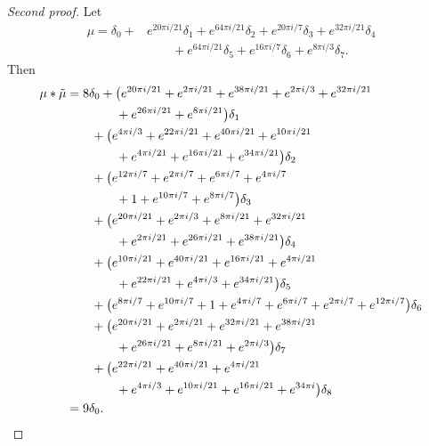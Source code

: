 \begin{proof}[Second proof] Let \begin{align*}\mu =
 \delta_{0}  + &  e^{ 20\pi i  / 21}\delta_{1}  +   e^{ 64\pi i  / 21}\delta_{2}  +   e^{ 20\pi i  / 7}\delta_{3}  +   e^{ 32\pi i  / 21}\delta_{4}  \\ &\qquad +   e^{ 64\pi i  / 21}\delta_{5}  +   e^{ 16\pi i  / 7}\delta_{6}  +   e^{ 8\pi i  / 3}\delta_{7}
.\end{align*}
  Then
\begin{align*} \mu * \tilde\mu&=   8\delta_{0}  +  \big( e^{ 20 \pi i / 21}+ e^{ 2 \pi i / 21}+ e^{ 38 \pi i / 21}+ e^{ 2 \pi i / 3}+ e^{ 32 \pi i / 21}
\\& \qquad \qquad+ e^{ 26 \pi i / 21}+ e^{ 8 \pi i / 21}\big)\delta_{1} 
\\& \qquad
 +  \big( e^{ 4 \pi i / 3}+ e^{ 22 \pi i / 21}+ e^{ 40 \pi i / 21}+ e^{ 10 \pi i / 21}
\\& \qquad \qquad+ e^{ 4 \pi i / 21}+ e^{ 16 \pi i / 21}+ e^{ 34 \pi i / 21}\big)\delta_{2} 
\\& \qquad
 +  \big( e^{ 12 \pi i / 7}+ e^{ 2 \pi i / 7}+ e^{ 6 \pi i / 7}+ e^{ 4 \pi i / 7}
\\& \qquad \qquad+ 1+ e^{ 10 \pi i / 7}+ e^{ 8 \pi i / 7}\big)\delta_{3} 
\\& \qquad
 +  \big( e^{ 20 \pi i / 21}+ e^{ 2 \pi i / 3}+ e^{ 8 \pi i / 21}+ e^{ 32 \pi i / 21}
\\& \qquad \qquad+ e^{ 2 \pi i / 21}+ e^{ 26 \pi i / 21}+ e^{ 38 \pi i / 21}\big)\delta_{4} 
\\& \qquad
 +  \big( e^{ 10 \pi i / 21}+ e^{ 40 \pi i / 21}+ e^{ 16 \pi i / 21}+ e^{ 4 \pi i / 21}
\\& \qquad \qquad+ e^{ 22 \pi i / 21}+ e^{ 4 \pi i / 3}+ e^{ 34 \pi i / 21}\big)\delta_{5} 
\\& \qquad
 +  \big( e^{ 8 \pi i / 7}+ e^{ 10 \pi i / 7}+ 1+ e^{ 4 \pi i / 7}+ e^{ 6 \pi i / 7}+ e^{ 2 \pi i / 7}+ e^{ 12 \pi i / 7}\big)\delta_{6} 
\\& \qquad
 +  \big( e^{ 20 \pi i / 21}+ e^{ 2 \pi i / 21}+ e^{ 32 \pi i / 21}+ e^{ 38 \pi i / 21}
\\& \qquad \qquad+ e^{ 26 \pi i / 21}+ e^{ 8 \pi i / 21}+ e^{ 2 \pi i / 3}\big)\delta_{7} 
\\& \qquad +  \big( e^{ 22 \pi i / 21}+ e^{ 40 \pi i / 21}+ e^{ 4 \pi i / 21}
\\& \qquad \qquad+ e^{ 4 \pi i / 3}+ e^{ 10 \pi i / 21}+ e^{ 16 \pi i / 21}+ e^{ 34 \pi i}\big)\delta_{8} 
\\&= 9\delta_0.
      \qedhere
\end{align*}
\end{proof}




